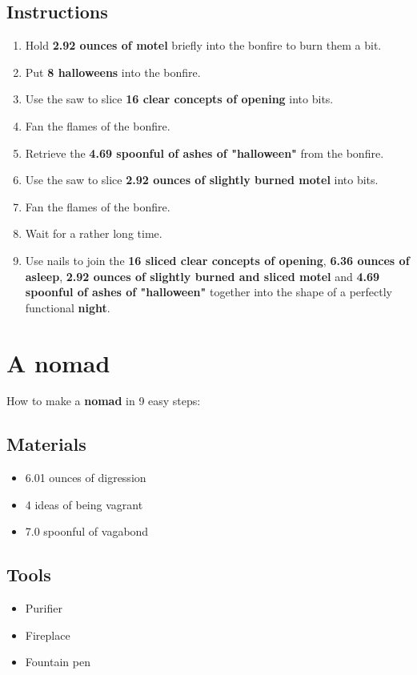 \documentclass{article}
\begin{document}
\subsection{Instructions}\begin{enumerate}
\item 
Hold \textbf{2.92 ounces of motel} briefly into the bonfire to burn them a bit.
\item 
Put \textbf{8 halloweens} into the bonfire.
\item 
Use the saw to slice \textbf{16 clear concepts of opening} into bits.
\item 
Fan the flames of the bonfire.
\item 
Retrieve the \textbf{4.69 spoonful of ashes of "halloween"} from the bonfire.
\item 
Use the saw to slice \textbf{2.92 ounces of slightly burned motel} into bits.
\item 
Fan the flames of the bonfire.
\item 
Wait for a rather long time.
\item 
Use nails to join the \textbf{16 sliced clear concepts of opening}, \textbf{6.36 ounces of asleep}, \textbf{2.92 ounces of slightly burned and sliced motel} and \textbf{4.69 spoonful of ashes of "halloween"} together into the shape of a perfectly functional \textbf{night}.
\end{enumerate}
\newpage
\section{A nomad}How to make a \textbf{nomad} in 9 easy steps:

\subsection{Materials}\begin{itemize}
\item 
6.01 ounces of digression
\item 
4 ideas of being vagrant
\item 
7.0 spoonful of vagabond
\end{itemize}
\subsection{Tools}\begin{itemize}
\item 
Purifier
\item 
Fireplace
\item 
Fountain pen
\end{itemize}
\end{document}
